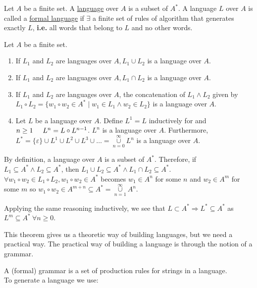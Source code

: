 \documentclass[10pt]{article}
\begin{document}
\begin{description}
		\item[qed]
		\item[Definition:] Let $A$ be a finite set. A \underline{language} over $A$ is a subset of $A^*$. A language $L$ over $A$ is called a \underline{formal language} if $\exists$ a finite set of rules of algorithm that generates exactly $L$, \textbf{i.e.} all words that belong to $L$ and no other words.
		\item[Theorem:] Let $A$ be a finite set.
		\begin{enumerate}
			\item If $L_1$ and $L_2$ are languages over $A, L_1 \cup L_2$ is a language over $A$.
			\item If $L_1$ and $L_2$ are languages over $A, L_1 \cap L_2$ is a language over $A$.
			\item If $L_1$ and $L_2$ are languages over $A$, the concatenation of $L_1 \land L_2$ given by $L_1 \circ L_2 = \{w_1 \circ w_2 \in A^* \mid w_1 \in L_1 \land w_2 \in L_2\}$ is a language over $A$.
			\item Let $L$ be a language over $A$. Define $L^1=L$ inductively for and $n\geq 1 \hspace{5mm} L^n = L \circ L^{n-1}$. $L^n$ is a language over $A$. Furthermore, $L^* = \{\varepsilon\} \cup L^1 \cup L^2 \cup L^3 \cup \dots = \underset{n=0}{\overset{\infty}{\cup}} L^n$ is a language over $A$.
		\end{enumerate}
		\item[Proof:] By definition, a language over $A$ is a subset of $A^*$. Therefore, if $L_1 \subseteq A^* \land L_2 \subseteq A^*$, then $L_1 \cup L_2 \subseteq A^* \land L_1 \cap L_2 \subseteq A^*$. $\forall w_1 \circ w_2 \in L_1 \circ L_2, w_1 \circ w_2 \in A^*$ becomes $w_1 \in A^n$ for some $n$ and $w_2 \in A^m$ for some $m$ so $w_1 \circ w_2 \in A^{m+n} \subseteq A^* = \underset{n=1}{\overset{\infty}{\cup}} A^n$.
		\item Applying the same reasoning inductively, we see that $L \subset A^* \Rightarrow L^* \subseteq A^*$ as $L^m \subseteq A^* \: \forall n \geq 0$.
		\item[qed]
		\item[Remark:] This theorem gives us a theoretic way of building languages, but we need a practical way. The practical way of building a language is through the notion of a grammar.
		\item[Definition:] A (formal) grammar is a set of production rules for strings in a language. \\
		To generate a language we use:

\end{description}
\end{document}

